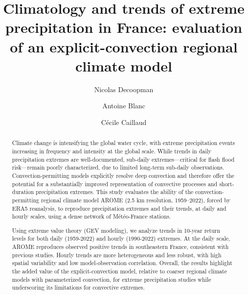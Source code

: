 \documentclass[hess, manuscript]{copernicus}
\begin{document}
\title{Climatology and trends of extreme precipitation in France: evaluation of an explicit-convection regional climate model}
\author[1]{Nicolas Decoopman}
\author[2]{Antoine Blanc}
\author[3]{Cécile Caillaud}



\maketitle


\begin{abstract}Climate change is intensifying the global water cycle, with extreme precipitation events increasing in frequency and intensity at the global scale. While trends in daily precipitation extremes are well-documented, sub-daily extremes---critical for flash flood risk---remain poorly characterized, due to limited long-term sub-daily observations. Convection-permitting models explicitly resolve deep convection and therefore offer the potential for a substantially improved representation of convective processes and short-duration precipitation extremes. This study evaluates the ability of the convection-permitting regional climate model AROME (2.5 km resolution, 1959--2022), forced by ERA5 reanalysis, to reproduce precipitation extremes and their trends, at daily and hourly scales, using a dense network of Météo-France stations.

Using extreme value theory (GEV modeling), we analyze trends in 10-year return levels for both daily (1959-2022) and hourly (1990-2022) extremes. At the daily scale, AROME reproduces observed positive trends in southeastern France, consistent with previous studies. Hourly trends are more heterogeneous and less robust, with high spatial variability and low model-observation correlation. Overall, the results highlight the added value of the explicit-convection model, relative to coarser regional climate models with parameterized convection, for extreme precipitation studies while underscoring its limitations for convective extremes.
\end{abstract}
\end{document}
